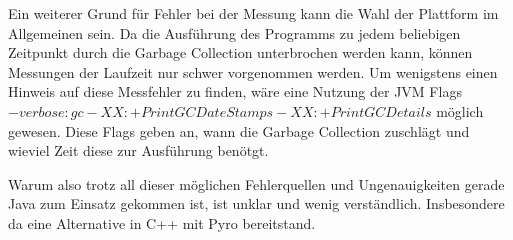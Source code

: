 Ein weiterer Grund für Fehler bei der Messung kann die Wahl der Plattform im Allgemeinen sein. Da die Ausführung des Programms zu jedem beliebigen Zeitpunkt durch die Garbage Collection unterbrochen werden kann, können Messungen der Laufzeit nur schwer vorgenommen werden. Um wenigstens einen Hinweis auf diese Messfehler zu finden, wäre eine Nutzung der JVM Flags $ -verbose:gc -XX:+PrintGCDateStamps -XX:+PrintGCDetails$ möglich gewesen. Diese Flags geben an, wann die Garbage Collection zuschlägt und wieviel Zeit diese zur Ausführung benötgt. \cite{andreasson2015JVM}  


Warum also trotz all dieser möglichen Fehlerquellen und Ungenauigkeiten gerade Java zum Einsatz gekommen ist, ist unklar und wenig verständlich. Insbesondere da eine Alternative in C++ mit Pyro bereitstand.


